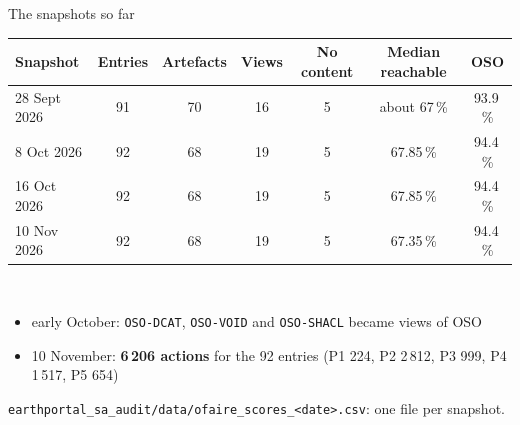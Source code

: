 \documentclass[aspectratio=169,10pt]{beamer}
\newcommand{\evidence}[1]{{\scriptsize\color{epgrey}#1}}
\newcommand{\code}[1]{\texttt{\small #1}}
\begin{document}
\begin{frame}{The snapshots so far}
  \small
  \begin{tabular}{@{}l c c c c c c@{}}
    \toprule
    Snapshot & Entries & Artefacts & Views & No content & Median reachable & OSO\\
    \midrule
    28 Sept 2026 & 91 & 70 & 16 & 5 & about 67\,\% & 93.9\,\%\\
    8 Oct 2026 & 92 & 68 & 19 & 5 & 67.85\,\% & 94.4\,\%\\
    16 Oct 2026 & 92 & 68 & 19 & 5 & 67.85\,\% & 94.4\,\%\\
    10 Nov 2026 & 92 & 68 & 19 & 5 & 67.35\,\% & 94.4\,\%\\
    \bottomrule
  \end{tabular}\\[10pt]
  \begin{itemize}
    \item early October: \code{OSO-DCAT}, \code{OSO-VOID} and \code{OSO-SHACL} became views of OSO
    \item 10 November: \textbf{6\,206 actions} for the 92 entries (P1 224, P2 2\,812, P3 999,
          P4 1\,517, P5 654)
  \end{itemize}
  \vfill
  \evidence{\code{earthportal\_sa\_audit/data/ofaire\_scores\_<date>.csv}: one file per snapshot.}
\end{frame}
\end{document}
